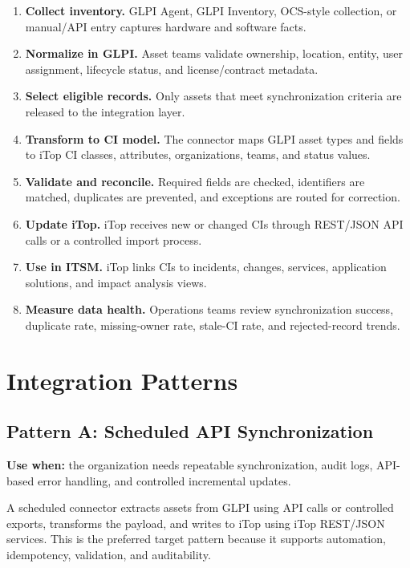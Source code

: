 \documentclass[11pt]{article}
\begin{document}
\begin{enumerate}
  \item \textbf{Collect inventory.} GLPI Agent, GLPI Inventory, OCS-style collection, or manual/API entry captures hardware and software facts.
  \item \textbf{Normalize in GLPI.} Asset teams validate ownership, location, entity, user assignment, lifecycle status, and license/contract metadata.
  \item \textbf{Select eligible records.} Only assets that meet synchronization criteria are released to the integration layer.
  \item \textbf{Transform to CI model.} The connector maps GLPI asset types and fields to iTop CI classes, attributes, organizations, teams, and status values.
  \item \textbf{Validate and reconcile.} Required fields are checked, identifiers are matched, duplicates are prevented, and exceptions are routed for correction.
  \item \textbf{Update iTop.} iTop receives new or changed CIs through REST/JSON API calls or a controlled import process.
  \item \textbf{Use in ITSM.} iTop links CIs to incidents, changes, services, application solutions, and impact analysis views.
  \item \textbf{Measure data health.} Operations teams review synchronization success, duplicate rate, missing-owner rate, stale-CI rate, and rejected-record trends.
\end{enumerate}

\section{Integration Patterns}

\subsection{Pattern A: Scheduled API Synchronization}

\begin{calloutbox}
\textbf{Use when:} the organization needs repeatable synchronization, audit logs, API-based error handling, and controlled incremental updates.
\end{calloutbox}

A scheduled connector extracts assets from GLPI using API calls or controlled exports, transforms the payload, and writes to iTop using iTop REST/JSON services. This is the preferred target pattern because it supports automation, idempotency, validation, and auditability.
\end{document}
